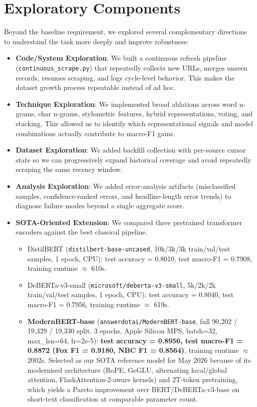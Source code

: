 \documentclass[10pt]{article}
\begin{document}

\section{Exploratory Components}

Beyond the baseline requirement, we explored several complementary directions to understand the task more deeply and improve robustness:
\begin{itemize}
    \item \textbf{Code/System Exploration}: We built a continuous refresh pipeline (\texttt{continuous\_scrape.py}) that repeatedly collects new URLs, merges unseen records, resumes scraping, and logs cycle-level behavior. This makes the dataset growth process repeatable instead of ad hoc.
    \item \textbf{Technique Exploration}: We implemented broad ablations across word n-grams, char n-grams, stylometric features, hybrid representations, voting, and stacking. This allowed us to identify which representational signals and model combinations actually contribute to macro-F1 gains.
    \item \textbf{Dataset Exploration}: We added backfill collection with per-source cursor state so we can progressively expand historical coverage and avoid repeatedly scraping the same recency window.
    \item \textbf{Analysis Exploration}: We added error-analysis artifacts (misclassified samples, confidence-ranked errors, and headline-length error trends) to diagnose failure modes beyond a single aggregate score.
    \item \textbf{SOTA-Oriented Extension}: We compared three pretrained transformer encoders against the best classical pipeline.
    \begin{itemize}
        \item DistilBERT (\texttt{distilbert-base-uncased}, 10k/3k/3k train/val/test samples, 1 epoch, CPU): test accuracy = 0.8010, test macro-F1 = 0.7908, training runtime $\approx$ 610s.
        \item DeBERTa-v3-small (\texttt{microsoft/deberta-v3-small}, 5k/2k/2k train/val/test samples, 1 epoch, CPU): test accuracy = 0.8040, test macro-F1 = 0.7956, training runtime $\approx$ 619s.
        \item \textbf{ModernBERT-base} (\texttt{answerdotai/ModernBERT-base}, full 90{,}202 / 19{,}329 / 19{,}330 split, 3 epochs, Apple Silicon MPS, batch=32, max\_len=64, lr=2e-5): \textbf{test accuracy = 0.8956, test macro-F1 = 0.8872 (Fox F1 = 0.9180, NBC F1 = 0.8564)}, training runtime $\approx$ 2002s. Selected as our SOTA reference model for May 2026 because of its modernised architecture (RoPE, GeGLU, alternating local/global attention, FlashAttention-2-aware kernels) and 2T-token pretraining, which yields a Pareto improvement over BERT/DeBERTa-v3-base on short-text classification at comparable parameter count.

\end{itemize}
\end{itemize}
\end{document}
